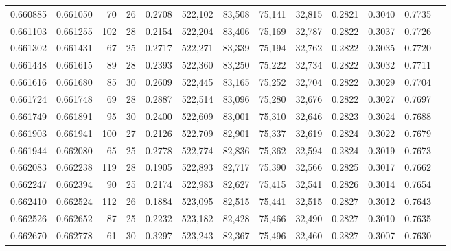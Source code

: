 \begin{tabular}{rrrrrrrrrrrrr}
0.660885 & 0.661050 &     70 &    26 &                                     0.2708 & 522,102 &  83,508 &  75,141 &  32,815 & 0.2821 & 0.3040 & 0.7735 \\
0.661103 & 0.661255 &    102 &    28 &                                     0.2154 & 522,204 &  83,406 &  75,169 &  32,787 & 0.2822 & 0.3037 & 0.7726 \\
0.661302 & 0.661431 &     67 &    25 &                                     0.2717 & 522,271 &  83,339 &  75,194 &  32,762 & 0.2822 & 0.3035 & 0.7720 \\
0.661448 & 0.661615 &     89 &    28 &                                     0.2393 & 522,360 &  83,250 &  75,222 &  32,734 & 0.2822 & 0.3032 & 0.7711 \\
0.661616 & 0.661680 &     85 &    30 &                                     0.2609 & 522,445 &  83,165 &  75,252 &  32,704 & 0.2822 & 0.3029 & 0.7704 \\
0.661724 & 0.661748 &     69 &    28 &                                     0.2887 & 522,514 &  83,096 &  75,280 &  32,676 & 0.2822 & 0.3027 & 0.7697 \\
0.661749 & 0.661891 &     95 &    30 &                                     0.2400 & 522,609 &  83,001 &  75,310 &  32,646 & 0.2823 & 0.3024 & 0.7688 \\
0.661903 & 0.661941 &    100 &    27 &                                     0.2126 & 522,709 &  82,901 &  75,337 &  32,619 & 0.2824 & 0.3022 & 0.7679 \\
0.661944 & 0.662080 &     65 &    25 &                                     0.2778 & 522,774 &  82,836 &  75,362 &  32,594 & 0.2824 & 0.3019 & 0.7673 \\
0.662083 & 0.662238 &    119 &    28 &                                     0.1905 & 522,893 &  82,717 &  75,390 &  32,566 & 0.2825 & 0.3017 & 0.7662 \\
0.662247 & 0.662394 &     90 &    25 &                                     0.2174 & 522,983 &  82,627 &  75,415 &  32,541 & 0.2826 & 0.3014 & 0.7654 \\
0.662410 & 0.662524 &    112 &    26 &                                     0.1884 & 523,095 &  82,515 &  75,441 &  32,515 & 0.2827 & 0.3012 & 0.7643 \\
0.662526 & 0.662652 &     87 &    25 &                                     0.2232 & 523,182 &  82,428 &  75,466 &  32,490 & 0.2827 & 0.3010 & 0.7635 \\
0.662670 & 0.662778 &     61 &    30 &                                     0.3297 & 523,243 &  82,367 &  75,496 &  32,460 & 0.2827 & 0.3007 & 0.7630 \\

\end{tabular}

